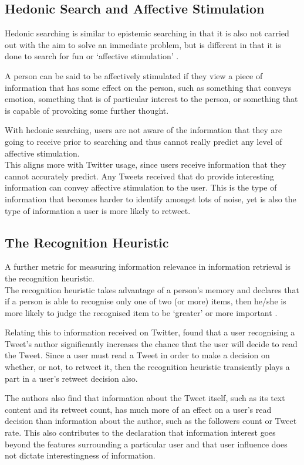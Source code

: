 \subsection{Hedonic Search and Affective Stimulation}
Hedonic searching is similar to epistemic searching in that it is also not carried out with the aim to solve an immediate problem, but is different in that it is done to search for fun or `affective stimulation' \cite{xu07}.

A person can be said to be affectively stimulated if they view a piece of information that has some effect on the person, such as something that conveys emotion, something that is of particular interest to the person, or something that is capable of provoking some further thought.

With hedonic searching, users are not aware of the information that they are going to receive prior to searching and thus cannot really predict any level of affective stimulation.\\
This aligns more with Twitter usage, since users receive information that they cannot accurately predict. Any Tweets received that do provide interesting information can convey affective stimulation to the user. This is the type of information that becomes harder to identify amongst lots of noise, yet is also the type of information a user is more likely to retweet.


\subsection{The Recognition Heuristic} 
A further metric for measuring information relevance in information retrieval is the recognition heuristic.\\
The recognition heuristic takes advantage of a person's memory and declares that if a person is able to recognise only one of two (or more) items, then he/she is more likely to judge the recognised item to be `greater' or more important \cite{oppenheimer03} \cite{goldstein99}.

Relating this to information received on Twitter, \cite{chorley12} found that a user recognising a Tweet's author significantly increases the chance that the user will decide to read the Tweet. Since a user must read a Tweet in order to make a decision on whether, or not, to retweet it, then the recognition heuristic transiently plays a part in a user's retweet decision also.

The authors also find that information about the Tweet itself, such as its text content and its retweet count, has much more of an effect on a user's read decision than information about the author, such as the followers count or Tweet rate. This also contributes to the declaration that information interest goes beyond the features surrounding a particular user and that user influence does not dictate interestingness of information.


